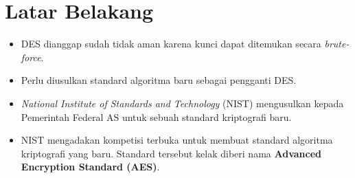 \documentclass{article}
\begin{document}

\section*{Latar Belakang}

\begin{itemize}
    \item DES dianggap sudah tidak aman karena kunci dapat ditemukan secara \textit{brute-force}.
    \item Perlu diusulkan standard algoritma baru sebagai pengganti DES.
    \item \textit{National Institute of Standards and Technology} (NIST) mengusulkan kepada Pemerintah Federal AS untuk sebuah standard kriptografi baru.
    \item NIST mengadakan kompetisi terbuka untuk membuat standard algoritma kriptografi yang baru. Standard tersebut kelak diberi nama \textbf{Advanced Encryption Standard (AES)}.
\end{itemize}
\end{document}
